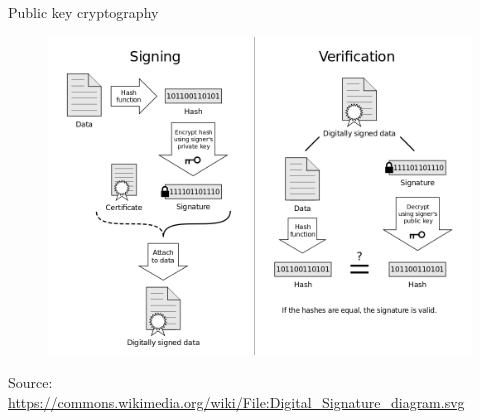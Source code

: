 \documentclass[11pt]{beamer}
\begin{document}
\begin{frame}{Public key cryptography}
	\begin{figure}[]
		\centering
		\includegraphics  [scale=0.2]{Images/Digital_Signature}
	\end{figure}
		\begin{tiny}
		Source: \href{https://commons.wikimedia.org/wiki/File:Digital\_Signature\_diagram.svg}{https://commons.wikimedia.org/wiki/File:Digital\_Signature\_diagram.svg}
	\end{tiny}
\end{frame}



\end{document}
